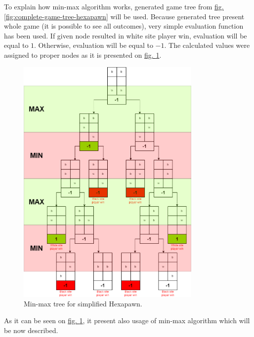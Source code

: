     To explain how min-max algorithm works, generated game tree from \hyperref[fig:complete-game-tree-hexapawn]{fig. \ref*{fig:complete-game-tree-hexapawn}} will be used. Because generated tree present whole game (it is possible to see all outcomes), very simple evaluation function has been used. If given node resulted in white site player win, evaluation will be equal to $1$. Otherwise, evaluation will be equal to $-1$. The calculated values were assigned to proper nodes as it is presented on \hyperref[fig:min-max-tree-hexapawn]{fig. \ref*{fig:min-max-tree-hexapawn}}.
    \begin{figure}
        \centering
        \includegraphics[width=0.8\textwidth]{dependencies/pictures/MinMax_Example.png}
        \caption{Min-max tree for simplified Hexapawn.}
        \label{fig:min-max-tree-hexapawn}
    \end{figure}

    As it can be seen on \hyperref[fig:min-max-tree-hexapawn]{fig. \ref*{fig:min-max-tree-hexapawn}}, it present also usage of min-max algorithm which will be now described.

